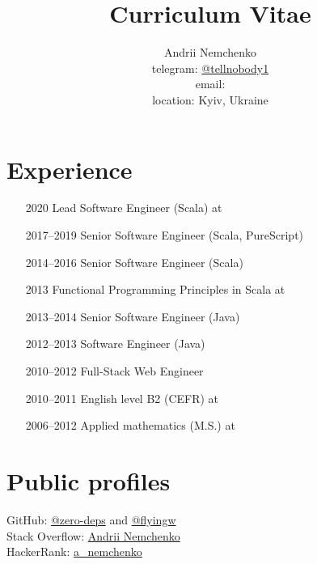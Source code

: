 

\title{Curriculum Vitae}
\author{
  Andrii Nemchenko\\
  telegram: \href{https://t.me/tellnobody1}{@tellnobody1}\\
  email: \\
  location: Kyiv, Ukraine
}
\maketitle

\section{Experience}
\begin{itemize}
  \item[2020] Lead Software Engineer (Scala) at 
  \item[2017–2019] Senior Software Engineer (Scala, PureScript)
  \item[2014–2016] Senior Software Engineer (Scala)
  \item[2013] Functional Programming Principles in Scala at 
  \item[2013–2014] Senior Software Engineer (Java)
  \item[2012–2013] Software Engineer (Java)
  \item[2010–2012] Full-Stack Web Engineer
  \item[2010–2011] English level B2 (CEFR) at 
  \item[2006–2012] Applied mathematics (M.S.) at 
\end{itemize}

\section{Public profiles}
GitHub:
\href{https://github.com/zero-deps}{@zero-deps} and
\href{https://github.com/flyingw}{@flyingw} \\
Stack Overflow:
\href{https://stackoverflow.com/users/355491}{Andrii Nemchenko} \\
HackerRank:
\href{https://www.hackerrank.com/a\_nemchenko}{a\_nemchenko}

\pagebreak

